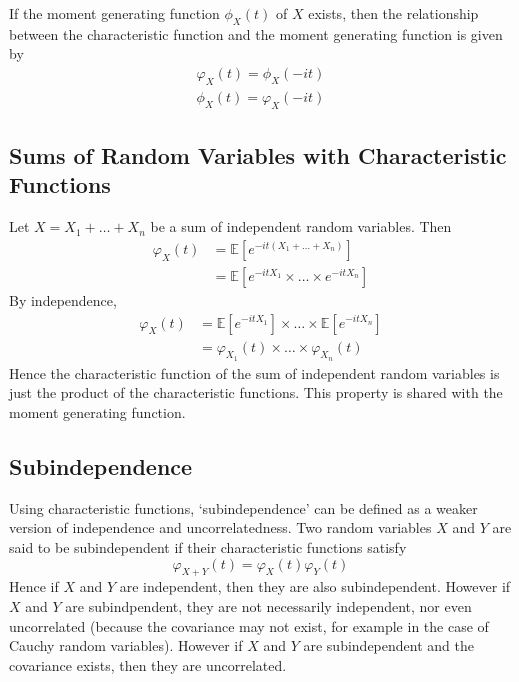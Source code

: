 \documentclass[11pt]{report} %
\begin{document}
If the moment generating function $\phi_{X}\left(t\right)$ of $X$ exists, then the relationship between the characteristic function and the moment generating function is given by
\begin{gather}
\varphi_{X}\left(t\right) = \phi_{X}\left(-it\right) \\
\phi_{X}\left(t\right) = \varphi_{X}\left(-it\right)
\end{gather}

\subsection{Sums of Random Variables with Characteristic Functions}

Let $X = X_{1} + \dots  + X_{n}$ be a sum of independent random variables. Then
\begin{align}
\varphi_{X}\left(t\right) &= \mathbb{E}\left[e^{-it\left(X_{1} + \dots + X_{n}\right)}\right] \\
&= \mathbb{E}\left[e^{-itX_{1}}\times\dots\times e^{-itX_{n}}\right]
\end{align}
By independence,
\begin{align}
\varphi_{X}\left(t\right) &= \mathbb{E}\left[e^{-itX_{1}}\right]\times\dots\times\mathbb{E}\left[e^{-itX_{n}}\right] \\
&= \varphi_{X_{1}}\left(t\right)\times\dots\times\varphi_{X_{n}}\left(t\right)
\end{align}
Hence the characteristic function of the sum of independent random variables is just the product of the characteristic functions. This property is shared with the moment generating function.

\subsection{Subindependence}

Using characteristic functions, `subindependence' can be defined as a weaker version of independence and uncorrelatedness. Two random variables $X$ and $Y$ are said to be subindependent if their characteristic functions satisfy
\begin{equation}
\varphi_{X+Y}\left(t\right) = \varphi_{X}\left(t\right)\varphi_{Y}\left(t\right)
\end{equation}
Hence if $X$ and $Y$ are independent, then they are also subindependent. However if $X$ and $Y$ are subindpendent, they are not necessarily independent, nor even uncorrelated (because the covariance may not exist, for example in the case of Cauchy random variables). However if $X$ and $Y$ are subindependent and the covariance exists, then they are uncorrelated.
\end{document}
